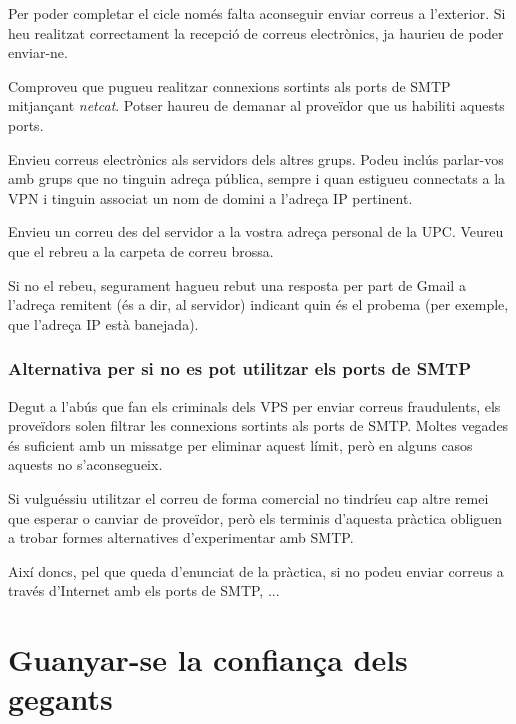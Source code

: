 \documentclass{practicaitic}
\begin{document}
Per poder completar el cicle només falta aconseguir enviar correus a l'exterior.
Si heu realitzat correctament la recepció de correus electrònics, ja haurieu
de poder enviar-ne.

\begin{previ}
  Comproveu que pugueu realitzar connexions sortints als ports de SMTP
  mitjançant \textit{netcat}. Potser haureu de demanar al proveïdor que
  us habiliti aquests ports.

\end{previ}

\begin{tasca}
  Envieu correus electrònics als servidors dels altres grups.
  Podeu inclús parlar-vos amb grups
  que no tinguin adreça pública, sempre i quan estigueu connectats
  a la VPN i tinguin associat un nom de domini a l'adreça IP pertinent.
\end{tasca}

\begin{tasca}
  Envieu un correu des del servidor a la vostra adreça personal de la UPC.
  Veureu que el rebreu a la carpeta de correu brossa.
  
  Si no el rebeu, segurament
  hagueu rebut una resposta per part de Gmail a l'adreça remitent (és a dir,
  al servidor) indicant quin és el probema (per exemple, que l'adreça IP està
  banejada). %
\end{tasca}

\subsubsection{Alternativa per si no es pot utilitzar els ports de SMTP}
\label{sec:plan-b}

Degut a l'abús que fan els criminals dels VPS per enviar correus
fraudulents, els proveïdors solen filtrar les connexions sortints
als ports de SMTP. Moltes vegades és suficient amb un missatge per
eliminar aquest límit, però en alguns casos aquests no s'aconsegueix.

Si vulguéssiu utilitzar el correu de forma comercial no tindríeu cap
altre remei que esperar o canviar de proveïdor, però els terminis
d'aquesta pràctica obliguen a trobar formes alternatives d'experimentar
amb SMTP.

Així doncs, pel que queda d'enunciat de la pràctica, si no podeu
enviar correus a través d'Internet amb els ports de SMTP, ...

\section{Guanyar-se la confiança dels gegants}
\label{sec:reputation}
\end{document}
